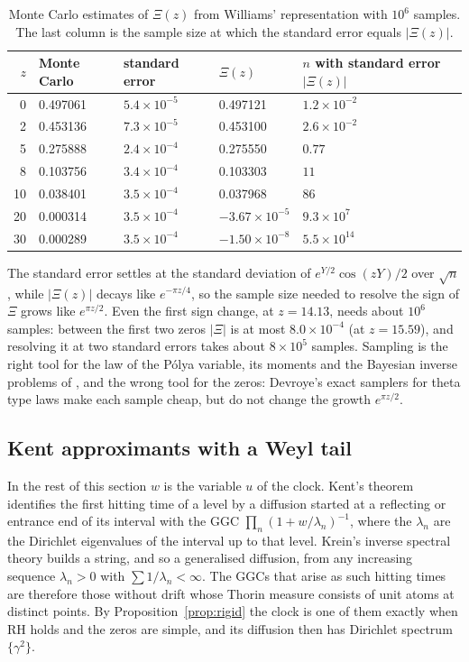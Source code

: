 \begin{table}[htbp]
\centering\small
\begin{tabular}{rllll}
\toprule
$z$ & Monte Carlo & standard error & $\Xi(z)$ & $n$ with standard error $|\Xi(z)|$\\
\midrule
0 & 0.497061 & $5.4\times10^{-5}$ & 0.497121 & $1.2\times10^{-2}$\\
2 & 0.453136 & $7.3\times10^{-5}$ & 0.453100 & $2.6\times10^{-2}$\\
5 & 0.275888 & $2.4\times10^{-4}$ & 0.275550 & $0.77$\\
8 & 0.103756 & $3.4\times10^{-4}$ & 0.103303 & $11$\\
10 & 0.038401 & $3.5\times10^{-4}$ & 0.037968 & $86$\\
20 & 0.000314 & $3.5\times10^{-4}$ & $-3.67\times10^{-5}$ & $9.3\times10^{7}$\\
30 & 0.000289 & $3.5\times10^{-4}$ & $-1.50\times10^{-8}$ & $5.5\times10^{14}$\\
\bottomrule
\end{tabular}
\caption{Monte Carlo estimates of $\Xi(z)$ from Williams' representation with $10^6$ samples. The last column is the sample size at which the standard error equals $|\Xi(z)|$.}
\label{tab:ch18:mc}
\end{table}

The standard error settles at the standard deviation of $e^{Y/2}\cos(zY)/2$ over $\sqrt n$, while $|\Xi(z)|$ decays like $e^{-\pi z/4}$, so the sample size needed to resolve the sign of $\Xi$ grows like $e^{\pi z/2}$. Even the first sign change, at $z=14.13$, needs about $10^{6}$ samples: between the first two zeros $|\Xi|$ is at most $8.0\times10^{-4}$ (at $z=15.59$), and resolving it at two standard errors takes about $8\times10^5$ samples. Sampling is the right tool for the law of the P\'olya variable, its moments and the Bayesian inverse problems of \cite[Section 19.2]{P26}, and the wrong tool for the zeros: Devroye's exact samplers for theta type laws \cite{Devroye86} make each sample cheap, but do not change the growth $e^{\pi z/2}$.

\subsection{Kent approximants with a Weyl tail}\label{sec:ch18:kent}

In the rest of this section $w$ is the variable $u$ of the clock. Kent's theorem \cite{Kent80} identifies the first hitting time of a level by a diffusion started at a reflecting or entrance end of its interval with the GGC $\prod_n(1+w/\lambda_n)^{-1}$, where the $\lambda_n$ are the Dirichlet eigenvalues of the interval up to that level. Krein's inverse spectral theory \cite{DymMcKean76} builds a string, and so a generalised diffusion, from any increasing sequence $\lambda_n>0$ with $\sum1/\lambda_n<\infty$. The GGCs that arise as such hitting times are therefore those without drift whose Thorin measure consists of unit atoms at distinct points. By Proposition~\ref{prop:rigid} the clock is one of them exactly when RH holds and the zeros are simple, and its diffusion then has Dirichlet spectrum $\{\gamma^2\}$.

